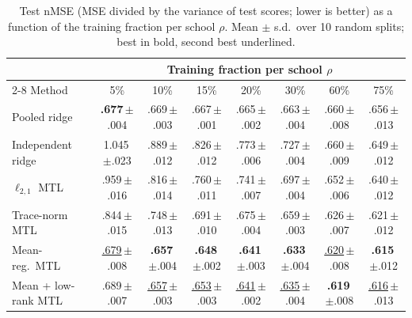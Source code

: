 \begin{table}[t]
\centering
\caption{Test nMSE (MSE divided by the variance of test scores; lower is better) as a function of the training fraction per school $\rho$. Mean $\pm$ s.d.\ over 10 random splits; best in bold, second best underlined.}
\label{tab:main}
\small
\setlength{\tabcolsep}{3.6pt}
\begin{tabular}{@{}lccccccc@{}}
\toprule
& \multicolumn{7}{c}{Training fraction per school $\rho$} \\
\cmidrule(l){2-8}
Method & 5\% & 10\% & 15\% & 20\% & 30\% & 60\% & 75\% \\
\midrule
Pooled ridge & \textbf{.677}\,{\scriptsize$\pm$.004} & .669\,{\scriptsize$\pm$.003} & .667\,{\scriptsize$\pm$.001} & .665\,{\scriptsize$\pm$.002} & .663\,{\scriptsize$\pm$.004} & .660\,{\scriptsize$\pm$.008} & .656\,{\scriptsize$\pm$.013} \\
Independent ridge & 1.045\,{\scriptsize$\pm$.023} & .889\,{\scriptsize$\pm$.012} & .826\,{\scriptsize$\pm$.012} & .773\,{\scriptsize$\pm$.006} & .727\,{\scriptsize$\pm$.004} & .660\,{\scriptsize$\pm$.009} & .649\,{\scriptsize$\pm$.012} \\
\midrule
$\ell_{2,1}$ MTL & .959\,{\scriptsize$\pm$.016} & .816\,{\scriptsize$\pm$.014} & .760\,{\scriptsize$\pm$.011} & .741\,{\scriptsize$\pm$.007} & .697\,{\scriptsize$\pm$.004} & .652\,{\scriptsize$\pm$.006} & .640\,{\scriptsize$\pm$.012} \\
Trace-norm MTL & .844\,{\scriptsize$\pm$.015} & .748\,{\scriptsize$\pm$.013} & .691\,{\scriptsize$\pm$.010} & .675\,{\scriptsize$\pm$.004} & .659\,{\scriptsize$\pm$.003} & .626\,{\scriptsize$\pm$.007} & .621\,{\scriptsize$\pm$.012} \\
\midrule
Mean-reg.\ MTL & \underline{.679}\,{\scriptsize$\pm$.008} & \textbf{.657}\,{\scriptsize$\pm$.004} & \textbf{.648}\,{\scriptsize$\pm$.002} & \textbf{.641}\,{\scriptsize$\pm$.003} & \textbf{.633}\,{\scriptsize$\pm$.004} & \underline{.620}\,{\scriptsize$\pm$.008} & \textbf{.615}\,{\scriptsize$\pm$.012} \\
Mean + low-rank MTL & .689\,{\scriptsize$\pm$.007} & \underline{.657}\,{\scriptsize$\pm$.003} & \underline{.653}\,{\scriptsize$\pm$.003} & \underline{.641}\,{\scriptsize$\pm$.002} & \underline{.635}\,{\scriptsize$\pm$.004} & \textbf{.619}\,{\scriptsize$\pm$.008} & \underline{.616}\,{\scriptsize$\pm$.013} \\
\bottomrule
\end{tabular}
\end{table}

